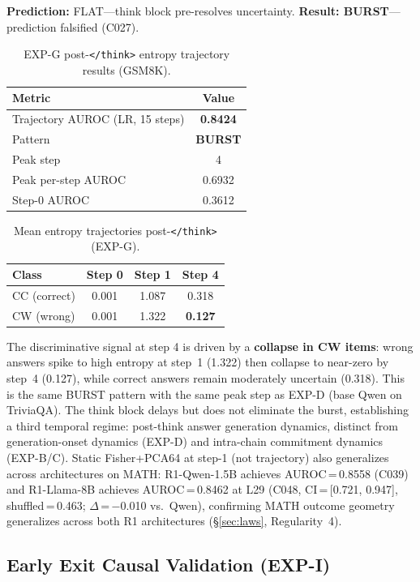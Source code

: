 \documentclass[11pt]{article}
\begin{document}
\textbf{Prediction:} FLAT---think block pre-resolves uncertainty. \textbf{Result: BURST}---
prediction falsified (C027).

\begin{table}[h!]
\centering
\caption{EXP-G post-\texttt{</think>} entropy trajectory results (GSM8K).}
\begin{tabular}{lc}
\toprule
Metric & Value \\
\midrule
Trajectory AUROC (LR, 15 steps) & \textbf{0.8424} \\
Pattern & \textbf{BURST} \\
Peak step & 4 \\
Peak per-step AUROC & 0.6932 \\
Step-0 AUROC & 0.3612 \\
\bottomrule
\end{tabular}
\end{table}

\begin{table}[h!]
\centering
\caption{Mean entropy trajectories post-\texttt{</think>} (EXP-G).}
\begin{tabular}{lccc}
\toprule
Class & Step 0 & Step 1 & Step 4 \\
\midrule
CC (correct) & 0.001 & 1.087 & 0.318 \\
CW (wrong) & 0.001 & 1.322 & \textbf{0.127} \\
\bottomrule
\end{tabular}
\end{table}

The discriminative signal at step 4 is driven by a \textbf{collapse in CW items}: wrong
answers spike to high entropy at step~1 (1.322) then collapse to near-zero by step~4
(0.127), while correct answers remain moderately uncertain (0.318). This is the same
BURST pattern with the same peak step as EXP-D (base Qwen on TriviaQA). The think block
delays but does not eliminate the burst, establishing a third temporal regime: post-think
answer generation dynamics, distinct from generation-onset dynamics (EXP-D) and
intra-chain commitment dynamics (EXP-B/C). Static Fisher+PCA64 at step-1 (not trajectory)
also generalizes across architectures on MATH: R1-Qwen-1.5B achieves AUROC\,=\,0.8558
(C039) and R1-Llama-8B achieves AUROC\,=\,0.8462 at L29 (C048, CI\,=\,[0.721, 0.947],
shuffled\,=\,0.463; $\Delta$\,=\,$-$0.010 vs.\ Qwen), confirming MATH outcome geometry
generalizes across both R1 architectures (\S\ref{sec:laws}, Regularity~4).

\subsection{Early Exit Causal Validation (EXP-I)}
\end{document}
